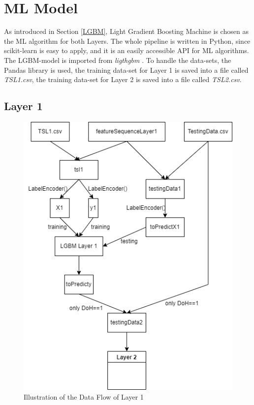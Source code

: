 \section{ML Model} \label{ml_model}
As introduced in Section \ref{LGBM}, Light Gradient Boosting Machine is chosen as the ML algorithm for both Layers. The whole pipeline is written in Python, since scikit-learn \cite{sklearn_api} is easy to apply, and it is an easily accessible API for ML algorithms. The LGBM-model is imported from \textit{ligthgbm} \cite{lightGBM}. To handle the data-sets, the Pandas library \cite{pandas} is used, the training data-set for Layer 1 is saved into a file called \textit{TSL1.csv}, the training data-set for Layer 2 is saved into a file called \textit{TSL2.csv}.

\subsection{Layer 1} \label{impl_l1}

\begin{figure} [h]
\includegraphics[scale=0.5]{images/layer_1.png}
\centering
\caption{Illustration of the Data Flow of Layer 1}
\label{fig:layer_1}
\end{figure}

